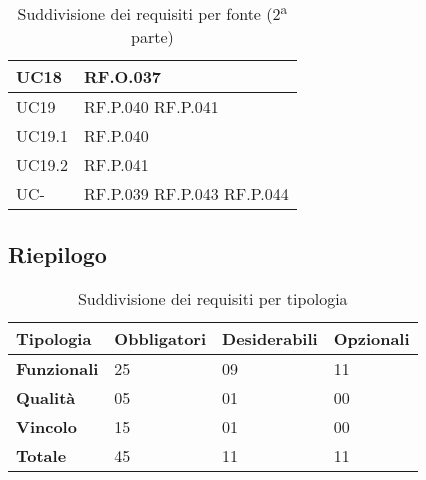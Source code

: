 \begin{table}[H]
\begin{tabular}{|C{3.0cm}|C{3.0cm}|}
        UC18 &
        RF.O.037 \\
        \hline   
        UC19 & 
        RF.P.040 \newline
        RF.P.041 \\
        \hline
        UC19.1 & 
        RF.P.040 \\
        \hline
        UC19.2 & 
        RF.P.041 \\
        \hline
        UC- &
        RF.P.039 \newline
        RF.P.043 \newline
        RF.P.044 \\
        \hline
    \end{tabular}
    \caption{Suddivisione dei requisiti per fonte (2\textsuperscript{a} parte)}
\end{table}

\subsection{Riepilogo}
\begin{table}[H]
\centering
    \begin{tabular}{|C{3.0cm}|C{2.5cm}|C{2.5cm}|C{2.5cm}|}
        \hline
         \textbf{Tipologia} &
         \textbf{Obbligatori} & 
         \textbf{Desiderabili} &
         \textbf{Opzionali} 
          \\
          \hline
          \textbf{Funzionali} & 25 & 09 & 11 \\
          \hline 
          \textbf{Qualità} & 05 & 01 & 00\\
          \hline
          \textbf{Vincolo} & 15 & 01 & 00\\
          \hline
          \textbf{Totale} & 45 & 11 & 11\\
          \hline
    \end{tabular}
    \caption{Suddivisione dei requisiti per tipologia}
\end{table}
